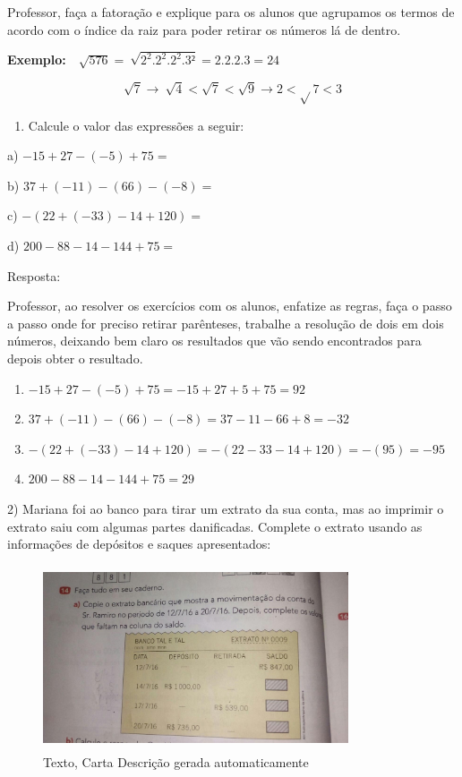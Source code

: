 Professor, faça a fatoração e explique para os alunos que agrupamos os
termos de acordo com o índice da raiz para poder retirar os números lá
de dentro.

\textbf{Exemplo:}
\(\text{\ \ \ \ \ \ \ \ \ \ \ \ \ \ \ \ \ \ \ \ \ \ }\sqrt{576} = \ \sqrt{2^{2}.2^{2}.2^{2}.3²} = 2.2.2.3 = 24\)

\[\sqrt{7} \rightarrow \ \sqrt{4} < \sqrt{7} < \sqrt{9} \rightarrow 2 < \sqrt{}7 < 3\]


\begin{enumerate}
\def\labelenumi{\arabic{enumi})}
\tightlist
\item
  Calcule o valor das expressões a seguir:
\end{enumerate}

a) \(- 15 + 27 - \left( - 5 \right) + 75 =\)

b) \(37 + \left( - 11 \right) - \left( 66 \right) - ( - 8) =\)

c) \(- (22 + \left( - 33 \right) - 14 + 120) =\)

d) \(200 - 88 - 14 - 144 + 75 =\)

Resposta:

Professor, ao resolver os exercícios com os alunos, enfatize as regras,
faça o passo a passo onde for preciso retirar parênteses, trabalhe a
resolução de dois em dois números, deixando bem claro os resultados que
vão sendo encontrados para depois obter o resultado.

\begin{enumerate}
\def\labelenumi{\alph{enumi})}
\item
  \(- 15 + 27 - \left( - 5 \right) + 75 = - 15 + 27 + 5 + 75 = 92\)
\item
  \(37 + \left( - 11 \right) - \left( 66 \right) - \left( - 8 \right) = 37 - 11 - 66 + 8 = - 32\)
\item
  \(- \left( 22 + \left( - 33 \right) - 14 + 120 \right) = - \left( 22 - 33 - 14 + 120 \right) = - \left( 95 \right) = - 95\)
\item
  \(200 - 88 - 14 - 144 + 75 = 29\)
\end{enumerate}

2) Mariana foi ao banco para tirar um extrato da sua conta, mas ao
imprimir o extrato saiu com algumas partes danificadas. Complete o
extrato usando as informações de depósitos e saques apresentados:

\begin{figure}
\centering
\includegraphics[width=3.54698in,height=2.14059in]{./imgSAEB_7_MAT/media/image2.jpg}
\caption{Texto, Carta Descrição gerada automaticamente}
\end{figure}

